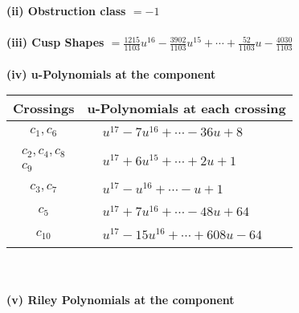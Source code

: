 \documentclass[1p]{elsarticle_modified}
\theoremstyle{definition}
\begin{document}
\flushleft \textbf{(ii) Obstruction class $= -1$}\\~\\
\flushleft \textbf{(iii) Cusp Shapes $= \frac{1215}{1103} u^{16}-\frac{3902}{1103} u^{15}+\cdots+\frac{52}{1103} u-\frac{4030}{1103}$}\\~\\
\newpage\renewcommand{\arraystretch}{1}
\flushleft \textbf{(iv) u-Polynomials at the component}\newline \\
\begin{tabular}{m{50pt}|m{274pt}}
Crossings & \hspace{64pt}u-Polynomials at each crossing \\
\hline $$\begin{aligned}c_{1},c_{6}\end{aligned}$$&$\begin{aligned}
&u^{17}-7 u^{16}+\cdots-36 u+8
\end{aligned}$\\
\hline $$\begin{aligned}c_{2},c_{4},c_{8}\\c_{9}\end{aligned}$$&$\begin{aligned}
&u^{17}+6 u^{15}+\cdots+2 u+1
\end{aligned}$\\
\hline $$\begin{aligned}c_{3},c_{7}\end{aligned}$$&$\begin{aligned}
&u^{17}- u^{16}+\cdots- u+1
\end{aligned}$\\
\hline $$\begin{aligned}c_{5}\end{aligned}$$&$\begin{aligned}
&u^{17}+7 u^{16}+\cdots-48 u+64
\end{aligned}$\\
\hline $$\begin{aligned}c_{10}\end{aligned}$$&$\begin{aligned}
&u^{17}-15 u^{16}+\cdots+608 u-64
\end{aligned}$\\
\hline
\end{tabular}\\~\\
\newpage\renewcommand{\arraystretch}{1}
\flushleft \textbf{(v) Riley Polynomials at the component}\newline \\
\end{document}

